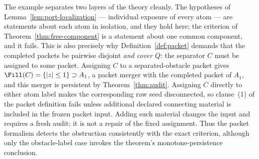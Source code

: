 The example separates two layers of the theory cleanly. The hypotheses of
Lemma~\ref{lem:port-localization} --- individual exposure of every atom --- are
statements about each atom in isolation, and they hold here; the criterion of
Theorem~\ref{thm:free-component} is a statement about one common component, and it
fails. This is also precisely why Definition~\ref{def:packet} demands that the
completed packets be pairwise disjoint \emph{and cover $Q$}: the separator $C$ must be
assigned to some packet.  Assigning $C$ to a separated-obstacle packet
gives $\Fill(C)=\{|z|\le1\}\supset A_1$, a packet merger with the completed
packet of $A_1$, and this merger is persistent by
Theorem~\ref{thm:audit}.  Assigning $C$ directly to either atom label makes
the corresponding raw seed disconnected, so clause~(1) of the packet
definition fails unless additional declared connecting material is included
in the frozen packet input.  Adding such material changes the input and
requires a fresh audit; it is not a repair of the fixed assignment.
Thus the packet formalism detects the obstruction consistently with the
exact criterion, although only the obstacle-label case invokes the
theorem's monotone-persistence conclusion.

